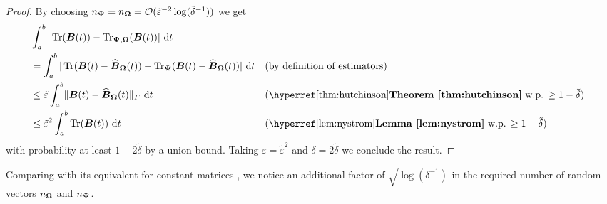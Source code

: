 \begin{proof}
    By choosing $n_{\boldsymbol{\Psi}} = n_{\boldsymbol{\Omega}} = \mathcal{O}(\tilde{\varepsilon}^{-2} \log(\tilde{\delta}^{-1}))$ we get
    \begin{align}
        &\int_{a}^{b} | \Trace(\mtx{B}(t)) - \Nystrpp{\mtx{\Omega}}{\mtx{\Psi}}(\mtx{B}(t)) |~\mathrm{d}t \notag \\
        &= \int_{a}^{b} | \Trace(\mtx{B}(t) - \Nystr{\mtx{\Omega}}{\mtx{B}}(t)) - \Hutch{\mtx{\Psi}}(\mtx{B}(t) - \Nystr{\mtx{\Omega}}{\mtx{B}}(t)) |~\mathrm{d}t && \text{(by definition of estimators)} \notag \\
        &\leq \tilde{\varepsilon} \int_{a}^{b} \lVert \mtx{B}(t) - \Nystr{\mtx{\Omega}}{\mtx{B}}(t) \rVert _F ~\mathrm{d}t && \text{(\refthm{thm:hutchinson} w.p. $\geq 1 - \tilde{\delta}$)} \notag \\
        &\leq \tilde{\varepsilon}^2 \int_{a}^{b} \Trace(\mtx{B}(t)) ~\mathrm{d}t && \text{(\reflem{lem:nystrom} w.p. $\geq 1 - \tilde{\delta}$)} 
    \end{align}
    with probability at least $1 - 2\tilde{\delta}$ by a union bound. Taking $\varepsilon = \tilde{\varepsilon}^2$ and $\delta = 2 \tilde{\delta}$ we conclude the result.

\end{proof}

Comparing  with its equivalent for constant matrices \cite[Theorem 3.4]{persson-2022-improved-variants}, we notice an additional factor of $\sqrt{\log(\delta^{-1})}$ in the required number of random vectors $n_{\boldsymbol{\Omega}}$ and $n_{\boldsymbol{\Psi}}$.

